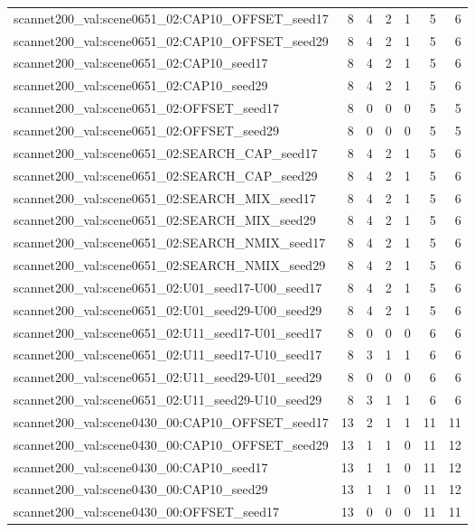 \begin{table}[t]
\begin{tabular}{lrrrrrr}
scannet200\_val:scene0651\_02:CAP10\_OFFSET\_seed17 & 8 & 4 & 2 & 1 & 5 & 6 \\
scannet200\_val:scene0651\_02:CAP10\_OFFSET\_seed29 & 8 & 4 & 2 & 1 & 5 & 6 \\
scannet200\_val:scene0651\_02:CAP10\_seed17 & 8 & 4 & 2 & 1 & 5 & 6 \\
scannet200\_val:scene0651\_02:CAP10\_seed29 & 8 & 4 & 2 & 1 & 5 & 6 \\
scannet200\_val:scene0651\_02:OFFSET\_seed17 & 8 & 0 & 0 & 0 & 5 & 5 \\
scannet200\_val:scene0651\_02:OFFSET\_seed29 & 8 & 0 & 0 & 0 & 5 & 5 \\
scannet200\_val:scene0651\_02:SEARCH\_CAP\_seed17 & 8 & 4 & 2 & 1 & 5 & 6 \\
scannet200\_val:scene0651\_02:SEARCH\_CAP\_seed29 & 8 & 4 & 2 & 1 & 5 & 6 \\
scannet200\_val:scene0651\_02:SEARCH\_MIX\_seed17 & 8 & 4 & 2 & 1 & 5 & 6 \\
scannet200\_val:scene0651\_02:SEARCH\_MIX\_seed29 & 8 & 4 & 2 & 1 & 5 & 6 \\
scannet200\_val:scene0651\_02:SEARCH\_NMIX\_seed17 & 8 & 4 & 2 & 1 & 5 & 6 \\
scannet200\_val:scene0651\_02:SEARCH\_NMIX\_seed29 & 8 & 4 & 2 & 1 & 5 & 6 \\
scannet200\_val:scene0651\_02:U01\_seed17-U00\_seed17 & 8 & 4 & 2 & 1 & 5 & 6 \\
scannet200\_val:scene0651\_02:U01\_seed29-U00\_seed29 & 8 & 4 & 2 & 1 & 5 & 6 \\
scannet200\_val:scene0651\_02:U11\_seed17-U01\_seed17 & 8 & 0 & 0 & 0 & 6 & 6 \\
scannet200\_val:scene0651\_02:U11\_seed17-U10\_seed17 & 8 & 3 & 1 & 1 & 6 & 6 \\
scannet200\_val:scene0651\_02:U11\_seed29-U01\_seed29 & 8 & 0 & 0 & 0 & 6 & 6 \\
scannet200\_val:scene0651\_02:U11\_seed29-U10\_seed29 & 8 & 3 & 1 & 1 & 6 & 6 \\
scannet200\_val:scene0430\_00:CAP10\_OFFSET\_seed17 & 13 & 2 & 1 & 1 & 11 & 11 \\
scannet200\_val:scene0430\_00:CAP10\_OFFSET\_seed29 & 13 & 1 & 1 & 0 & 11 & 12 \\
scannet200\_val:scene0430\_00:CAP10\_seed17 & 13 & 1 & 1 & 0 & 11 & 12 \\
scannet200\_val:scene0430\_00:CAP10\_seed29 & 13 & 1 & 1 & 0 & 11 & 12 \\
scannet200\_val:scene0430\_00:OFFSET\_seed17 & 13 & 0 & 0 & 0 & 11 & 11 \\

\end{tabular}
\end{table}
